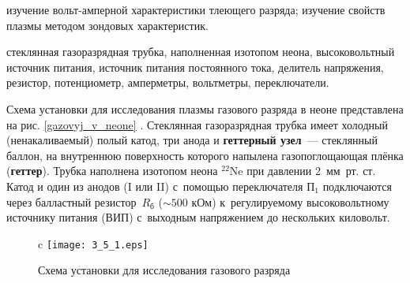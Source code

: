 




\begin{lab:aim}
изучение вольт-амперной характеристики тлеющего разряда; изучение свойств плазмы методом зондовых характеристик.
\end{lab:aim}

\begin{lab:equipment}
стеклянная газоразрядная трубка, наполненная изотопом неона, высоковольтный источник питания, источник питания
постоянного тока, делитель напряжения, резистор, потенциометр, амперметры, вольтметры, переключатели. 
\end{lab:equipment}

Схема установки для исследования плазмы газового разряда в неоне представлена на рис. \ref{gazovyj_v_neone}%
. Стеклянная газоразрядная
трубка имеет холодный (ненакаливаемый) полый катод, три анода и \textbf{геттерный узел}~--- стеклянный баллон, на
внутреннюю поверхность которого напылена газопоглощающая плёнка (\textbf{геттер}). Трубка наполнена изотопом неона 
$^{22}$Ne при давлении 2~мм~рт. ст. Катод и один из анодов (I или II) с~помощью переключателя П$_1$ подключаются через
балластный резистор~$R_{б}$ ($\sim500$ кОм) к~регулируемому высоковольтному источнику питания (ВИП) с~выходным
напряжением до нескольких киловольт.

\begin{figure}{c}
	\texttt{[image: 3\_5\_1.eps]}
	\caption{Схема установки для исследования газового разряда}
\end{figure}

